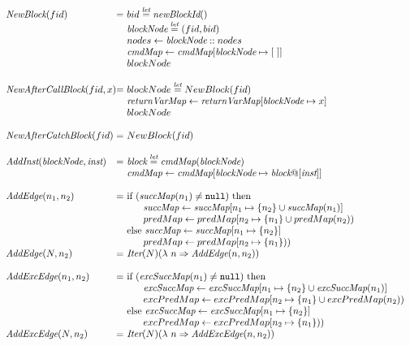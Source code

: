 \[
\begin{array}{l@{}l@{~}l}
\emph{NewBlock}(fid)
	& = & bid \letval \emph{newBlockId}()\\
	& & \emph{blockNode} \letval (fid,bid)\\
	& & nodes \leftarrow \emph{blockNode}::nodes\\
	& & \emph{cmdMap} \leftarrow \emph{cmdMap}[\emph{blockNode} \mapsto [\ ]]\\
   & & blockNode \\
	& & \\

\emph{NewAfterCallBlock}(fid,x)
	& = & blockNode \letval NewBlock(fid) \\
	& & \emph{returnVarMap} \leftarrow \emph{returnVarMap}[\emph{blockNode} \mapsto x] \\
   & & blockNode \\
	& & \\

\emph{NewAfterCatchBlock}(fid)
	& = & NewBlock(fid) \\
	& & \\

\emph{AddInst}(\emph{blockNode}, \emph{inst})
	& = & \emph{block} \letval \emph{cmdMap}(\emph{blockNode})\\
	& & \emph{cmdMap} \leftarrow \emph{cmdMap}[\emph{blockNode} \mapsto \emph{block}@[\emph{inst}]]\\
	& & \\

\emph{AddEdge}(n_1,n_2)
	& = & \mbox{if}\ (\emph{succMap}(n_1) \neq \nullK)\ \mbox{then}\\
	& & \phantom{else} \emph{succMap} \leftarrow \emph{succMap}[n_1 \mapsto \{n_2\}\cup \emph{succMap}(n_1)]\\
	& & \phantom{else} predMap \leftarrow predMap[n_2 \mapsto \{n_1\}\cup predMap(n_2))\\
	& & \mbox{else}\ \emph{succMap} \leftarrow \emph{succMap}[n_1 \mapsto \{n_2\}]\\
	& & \phantom{else} predMap \leftarrow predMap[n_2 \mapsto \{n_1\}))\\
\emph{AddEdge}(N,n_2)
	& = & \Iter(N)(\lambda\ n\Rightarrow \emph{AddEdge}(n,n_2)) \\
	& & \\

\emph{AddExcEdge}(n_1,n_2)
	& = & \mbox{if}\ (\emph{excSuccMap}(n_1) \neq \nullK)\ \mbox{then}\\
	& & \phantom{else} \emph{excSuccMap} \leftarrow \emph{excSuccMap}[n_1 \mapsto \{n_2\}\cup \emph{excSuccMap}(n_1)]\\
	& & \phantom{else} excPredMap \leftarrow excPredMap[n_2 \mapsto \{n_1\}\cup excPredMap(n_2))\\
	& & \mbox{else}\ \emph{excSuccMap} \leftarrow \emph{excSuccMap}[n_1 \mapsto \{n_2\}]\\
	& & \phantom{else} excPredMap \leftarrow excPredMap[n_2 \mapsto \{n_1\}))\\
\emph{AddExcEdge}(N,n_2)
	& = & \Iter(N)(\lambda\ n\Rightarrow \emph{AddExcEdge}(n,n_2)) \\
	& & \\
	

\end{array}\]
